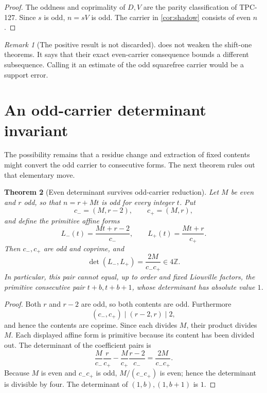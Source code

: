 \documentclass[11pt]{article}
\newtheorem{theorem}{Theorem}[section]
\theoremstyle{definition}
\theoremstyle{remark}
\newtheorem{remark}[theorem]{Remark}
\begin{document}
\begin{proof}
The oddness and coprimality of \(D,V\) are the parity classification
of TPC-127.  Since \(s\) is odd, \(n=sV\) is odd.  The carrier in
\cref{cor:shadow} consists of even \(n\).
\end{proof}

\begin{remark}[The positive result is not discarded]
 does not weaken the shift-one theorems.  It says
that their exact even-carrier consequence bounds a different
subsequence.  Calling it an estimate of the odd squarefree carrier
would be a support error.
\end{remark}

\section{An odd-carrier determinant invariant}

The possibility remains that a residue change and extraction of
fixed contents might convert the odd carrier to consecutive forms.
The next theorem rules out that elementary move.

\begin{theorem}[Even determinant survives odd-carrier reduction]
\label{thm:invariant}
Let \(M\) be even and \(r\) odd, so that
\(n=r+Mt\) is odd for every integer \(t\).  Put
\[
 c_-=(M,r-2),\qquad c_+=(M,r),
\]
and define the primitive affine forms
\[
 L_-(t)=\frac{Mt+r-2}{c_-},
 \qquad
 L_+(t)=\frac{Mt+r}{c_+}.
\]
Then \(c_-,c_+\) are odd and coprime, and
\begin{equation}
\boxed{
 \det(L_-,L_+)=\frac{2M}{c_-c_+}\in4\mathbb Z.}
\label{eq:reduced-det}
\end{equation}
In particular, this pair cannot equal, up to order and fixed
Liouville factors, the primitive consecutive pair \(t+b,t+b+1\),
whose determinant has absolute value \(1\).
\end{theorem}

\begin{proof}
Both \(r\) and \(r-2\) are odd, so both contents are odd.
Furthermore
\[
 (c_-,c_+)\mid(r-2,r)\mid2,
\]
and hence the contents are coprime.  Since each divides \(M\), their
product divides \(M\).  Each displayed affine form is primitive
because its content has been divided out.  The determinant of the
coefficient pairs is
\[
 \frac{M}{c_-}\frac{r}{c_+}
 -
 \frac{M}{c_+}\frac{r-2}{c_-}
 =
 \frac{2M}{c_-c_+}.
\]
Because \(M\) is even and \(c_-c_+\) is odd,
\(M/(c_-c_+)\) is even; hence the determinant is divisible by four.
The determinant of
\((1,b),(1,b+1)\) is \(1\).
\end{proof}
\end{document}
